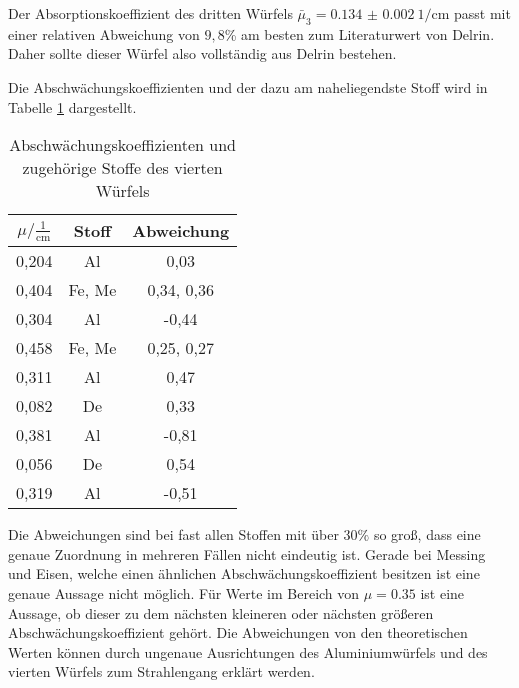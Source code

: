 Der Absorptionskoeffizient des dritten Würfels $\bar\mu_3 = \SI{0.134(2)}{1\per\centi\meter}$
passt mit einer relativen Abweichung von $9,8$\% am besten zum Literaturwert von
Delrin. Daher sollte dieser Würfel also vollständig aus Delrin bestehen.



Die Abschwächungskoeffizienten und der dazu am naheliegendste Stoff wird in
Tabelle \ref{tab:abw} dargestellt.

\begin{table}[H]
  \centering
  \caption{Abschwächungskoeffizienten und zugehörige Stoffe des vierten Würfels}
  \label{tab:abw}
  \begin{tabular}{c c c}
    \toprule
    $\mu/ \mathrm{\frac{1}{cm}}$ & Stoff & Abweichung   \\
    \midrule
    0,204      &  Al     &   0,03    \\
    0,404      &  Fe, Me &   0,34, 0,36    \\
    0,304      &  Al     &  -0,44    \\
    0,458      &  Fe, Me &   0,25, 0,27    \\
    0,311      &  Al     &   0,47    \\
    0,082      &  De     &   0,33    \\
    0,381      &  Al     &  -0,81    \\
    0,056      &  De     &   0,54   \\
    0,319      &  Al     &  -0,51  \\
    \bottomrule
  \end{tabular}
\end{table}

Die Abweichungen sind bei fast allen Stoffen mit über $30\%$ so groß, dass
eine genaue Zuordnung in mehreren Fällen nicht eindeutig ist. Gerade bei Messing und
Eisen, welche einen ähnlichen Abschwächungskoeffizient besitzen ist eine genaue
Aussage nicht möglich. Für Werte im Bereich von $\mu = 0.35$ ist eine Aussage, ob
dieser zu dem nächsten kleineren oder nächsten größeren Abschwächungskoeffizient
gehört. Die Abweichungen von den theoretischen Werten können durch ungenaue Ausrichtungen des
Aluminiumwürfels und des vierten Würfels zum Strahlengang erklärt werden.
